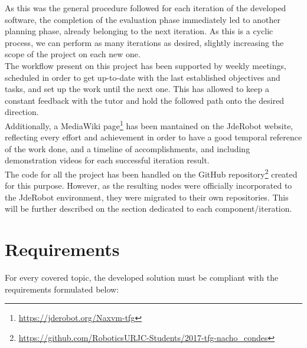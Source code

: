 As this was the general procedure followed for each iteration of the developed software, the completion of the evaluation phase immediately led to another planning phase, already belonging to the next iteration. As this is a cyclic process, we can perform as many iterations as desired, slightly increasing the scope of the project on each new one.\\

The workflow present on this project has been supported by weekly meetings, scheduled in order to get up-to-date with the last established objectives and tasks, and set up the work until the next one. This has allowed to keep a constant feedback with the tutor and hold the followed path onto the desired direction.\\


Additionally, a MediaWiki page\footnote{\url{https://jderobot.org/Naxvm-tfg}} has been mantained on the JdeRobot website, reflecting every effort and achievement in order to have a good temporal reference of the work done, and a timeline of accomplishments, and including demonstration videos for each successful iteration result.\\

The code for all the project has been handled on the GitHub repository\footnote{\url{https://github.com/RoboticsURJC-Students/2017-tfg-nacho\_condes}} created for this purpose. However, as the resulting nodes were officially incorporated to the JdeRobot environment, they were migrated to their own repositories. This will be further described on the section dedicated to each component/iteration.\\


\section{Requirements}
\label{sec:2_requirements}
For every covered topic, the developed solution must be compliant with the requirements formulated below:

